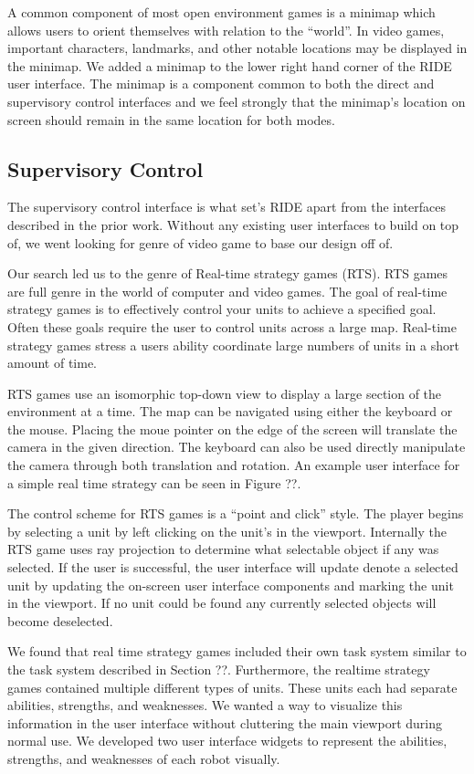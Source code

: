 A common component of most open environment games is a minimap which allows users to orient themselves with relation to the ``world''. In video games, important characters, landmarks, and other notable locations may be displayed in the minimap. We added a minimap to the lower right hand corner of the RIDE user interface. The minimap is a component common to both the direct and supervisory control interfaces and we feel strongly that the minimap's location on screen should remain in the same location for both modes.

\subsection{Supervisory Control}

The supervisory control interface is what set's RIDE apart from the interfaces described in the prior work. Without any existing user interfaces to build on top of, we went looking for genre of video game to base our design off of.

Our search led us to the genre of Real-time strategy games (RTS). RTS games are full genre in the world of computer and video games. The goal of real-time strategy games is to effectively control your units to achieve a specified goal. Often these goals require the user to control units across a large  map. Real-time strategy games stress a users ability coordinate large numbers of units in a short amount of time. 

RTS games use an isomorphic top-down view to display a large section of the environment at a time. The map can be navigated using either the keyboard or the mouse. Placing the moue pointer on the edge of the screen will translate the camera in the given direction. The keyboard can also be used directly manipulate the camera through both translation and rotation. An example user interface for a simple real time strategy can be seen in Figure ??. 

The control scheme for RTS games is a ``point and click'' style. The player begins by selecting a unit by left clicking on the unit's in the viewport. Internally the RTS game uses ray projection to determine what selectable object if any was selected. If the user is successful, the user interface will update denote a selected unit by updating the on-screen user interface components and marking the unit in the viewport. If no unit could be found any currently selected objects will become deselected.

We found that real time strategy games included their own task system similar to the task system described in Section ??. Furthermore, the realtime strategy games contained multiple different types of units. These units each had separate abilities, strengths, and weaknesses. We wanted a way to visualize this information in the user interface without cluttering the main viewport during normal use. We developed two user interface widgets to represent the abilities, strengths, and weaknesses of each robot visually. 

